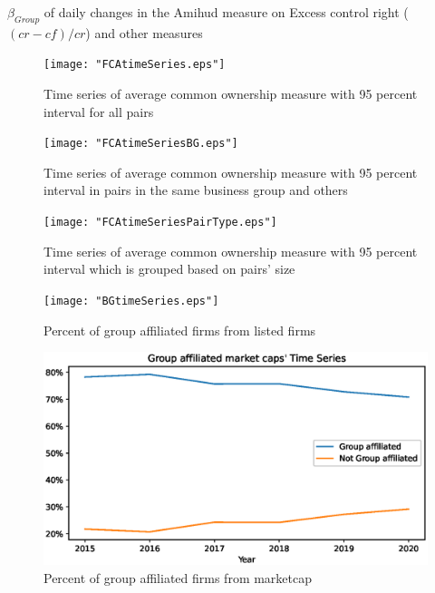 \documentclass[12pt, a4paper]{article}
\begin{document}
	\begin{table}[htbp]
	\centering
	\caption{$ \beta_{Group} $ of daily changes in the Amihud measure  on Excess control right ($ (cr - cf)/cr $) and other measures   }
	\resizebox{0.7\textheight}{!}{
		\centering
		
	}
\label{Amihudcrosssection}
\end{table}

\newpage
		\begin{figure}
	\centering  
	\caption{Time series of average common ownership measure with 95 percent interval for all pairs}
	\texttt{[image: "FCAtimeSeries.eps"]}
	
\end{figure} 

			\begin{figure}
	\centering  
	\caption{Time series of average common ownership measure with 95 percent interval in pairs in the same business group and others}
	\texttt{[image: "FCAtimeSeriesBG.eps"]}
\end{figure}    

\begin{figure}
	\centering  
	\caption{Time series of average common ownership measure with 95 percent interval which is grouped based on pairs' size}
	\texttt{[image: "FCAtimeSeriesPairType.eps"]}
\end{figure}




	\begin{figure}
	\centering  
	\caption{Percent of group affiliated firms from listed firms}
	\texttt{[image: "BGtimeSeries.eps"]}
	
\end{figure}  

\begin{figure}
	\centering  
	\caption{Percent of group affiliated firms from marketcap}
	\includegraphics[width=\linewidth]{"BGMarketCaptimeSeries.eps"}
	
\end{figure}
 
%
\end{document}
